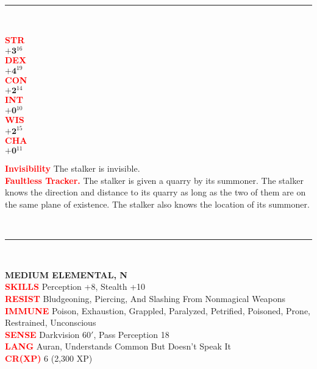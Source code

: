 \documentclass{article}
\begin{document}
\begin{minipage}[t][10in][t]{0.4\textwidth}
\begin{minipage}[t]{0.7\textwidth}
	\end{minipage}
	\vspace{0.025in}\\
	\rule{\textwidth}{1pt}\\
	\vspace{0.025in}
	\begin{minipage}[t]{0.2\textwidth}
		{\large
		\textcolor{red}{\textbf{STR}}\\[0.1em]
		$\mathbf{+3}$\quad$^{16}$ \\[0.1em]
		\textcolor{red}{\textbf{DEX}}\\[0.1em]
		$\mathbf{+4}$\quad$^{19}$ \\[0.1em]
		\textcolor{red}{\textbf{CON}}\\[0.1em]
		$\mathbf{+2}$\quad$^{14}$ \\[0.1em]
		\textcolor{red}{\textbf{INT}}\\[0.1em]
		$\mathbf{+0}$\quad$^{10}$ \\[0.1em]
		\textcolor{red}{\textbf{WIS}}\\[0.1em]
		$\mathbf{+2}$\quad$^{15}$ \\[0.1em]
		\textcolor{red}{\textbf{CHA}}\\[0.1em]
		$\mathbf{+0}$\quad$^{11}$ \\[0.1em]
		}
	\end{minipage}
	\hspace{-0.1in}
	\vline
	\hspace{0.1in}
	\begin{minipage}[t]{0.7\textwidth}
		\textcolor{red}{\textbf{Invisibility}} The stalker is invisible. \\[0.2em]
		\textcolor{red}{\textbf{Faultless Tracker.}} The stalker is given a quarry by its summoner. The stalker knows the direction and distance to its quarry as long as the two of them are on the same plane of existence. The stalker also knows the location of its summoner.
	\end{minipage}
	\vspace{0.025in}\\
	\rule{\textwidth}{1pt}\\
	\vspace{-0.08in}
	\begin{flushleft}
		{\large\textbf{MEDIUM ELEMENTAL, N}}\\
		\textcolor{red}{\textbf{SKILLS}} Perception +8, Stealth +10 \\
		\textcolor{red}{\textbf{RESIST}} Bludgeoning, Piercing, And Slashing From Nonmagical Weapons\\
		\textcolor{red}{\textbf{IMMUNE}} Poison, Exhaustion, Grappled, Paralyzed, Petrified, Poisoned, Prone, Restrained, Unconscious\\
		\textcolor{red}{\textbf{SENSE}} Darkvision $60'$, Pass Perception 18\\
		\textcolor{red}{\textbf{LANG}} Auran, Understands Common But Doesn't Speak It\\
		\textcolor{red}{\textbf{CR(XP)}}  6 (2,300 XP)\\
	\end{flushleft}
	

\end{minipage}
\end{document}
